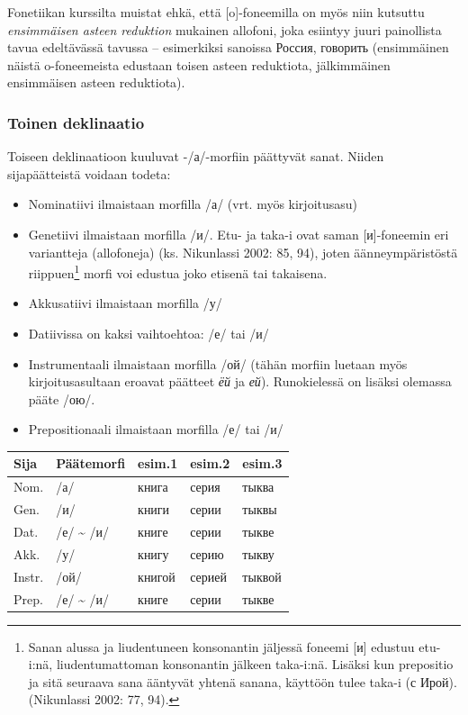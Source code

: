 \documentclass[]{scrartcl}
\providecommand{\tightlist}{%
  \setlength{\itemsep}{0pt}\setlength{\parskip}{0pt}}
\begin{document}
Fonetiikan kurssilta muistat ehkä, että {[}o{]}-foneemilla on myös niin
kutsuttu \emph{ensimmäisen asteen reduktion} mukainen allofoni, joka
esiintyy juuri painollista tavua edeltävässä tavussa -- esimerkiksi
sanoissa Россия, говорить (ensimmäinen näistä o-foneemeista edustaan
toisen asteen reduktiota, jälkimmäinen ensimmäisen asteen reduktiota).

\subsubsection{Toinen deklinaatio}\label{toinen-deklinaatio}

Toiseen deklinaatioon kuuluvat -/а/-morfiin päättyvät sanat. Niiden
sijapäätteistä voidaan todeta:

\begin{itemize}
\tightlist
\item
  Nominatiivi ilmaistaan morfilla /а/ (vrt. myös kirjoitusasu)
\item
  Genetiivi ilmaistaan morfilla /и/. Etu- ja taka-i ovat saman
  {[}и{]}-foneemin eri variantteja (allofoneja) (ks. Nikunlassi 2002:
  85, 94), joten äänneympäristöstä riippuen\footnote{Sanan alussa ja
    liudentuneen konsonantin jäljessä foneemi {[}и{]} edustuu etu-i:nä,
    liudentumattoman konsonantin jälkeen taka-i:nä. Lisäksi kun
    prepositio ja sitä seuraava sana ääntyvät yhtenä sanana, käyttöön
    tulee taka-i (с Ирой). (Nikunlassi 2002: 77, 94).} morfi voi edustua
  joko etisenä tai takaisena.
\item
  Akkusatiivi ilmaistaan morfilla /у/
\item
  Datiivissa on kaksi vaihtoehtoa: /е/ tai /и/
\item
  Instrumentaali ilmaistaan morfilla /ой/ (tähän morfiin luetaan myös
  kirjoitusasultaan eroavat päätteet \emph{ёй} ja \emph{ей}).
  Runokielessä on lisäksi olemassa pääte /ою/.
\item
  Prepositionaali ilmaistaan morfilla /е/ tai /и/
\end{itemize}

\begin{longtable}[c]{@{}lllll@{}}
\toprule
Sija & Päätemorfi & esim.1 & esim.2 & esim.3\tabularnewline
\midrule
\endhead
Nom. & /а/ & книга & серия & тыква\tabularnewline
Gen. & /и/ & книги & серии & тыквы\tabularnewline
Dat. & /е/ \textasciitilde{} /и/ & книге & серии & тыкве\tabularnewline
Akk. & /у/ & книгу & серию & тыкву\tabularnewline
Instr. & /ой/ & книгой & серией & тыквой\tabularnewline
Prep. & /е/ \textasciitilde{} /и/ & книге & серии & тыкве\tabularnewline
\bottomrule
\end{longtable}
\end{document}
